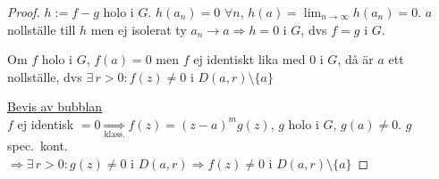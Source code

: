\begin{proof}
$h := f - g$ holo i $G$. $h(a_n) = 0$ $\forall n$,
$h(a) = \lim_{n \to \infty} h(a_n) = 0$. $a$ nollställe till $h$ men ej isolerat ty $a_n \to a \Rightarrow h = 0$ i $G$, dvs $f = g$ i $G$.

\begin{framed}
Om $f$ holo i $G$, $f(a) = 0$ men $f$ ej identiskt lika med $0$ i $G$, då är $a$ ett  nollställe, dvs $\exists\, r > 0 : f(z) \neq 0$ i $D(a, r) \setminus \{a\}$
\end{framed}
\underline{Bevis av bubblan}\\
$f$ ej identisk $= 0 \underset{\text{klass.}}{\Rightarrow} f(z) = (z - a)^m g(z)$, $g$ holo i $G$, $g(a) \neq 0$. $g$ spec.\ kont.\\
$\Rightarrow \exists\, r > 0 : g(z) \neq 0$ i $D(a, r) \Rightarrow f(z) \neq 0$ i $D(a, r) \setminus \{a\}$
\end{proof}
